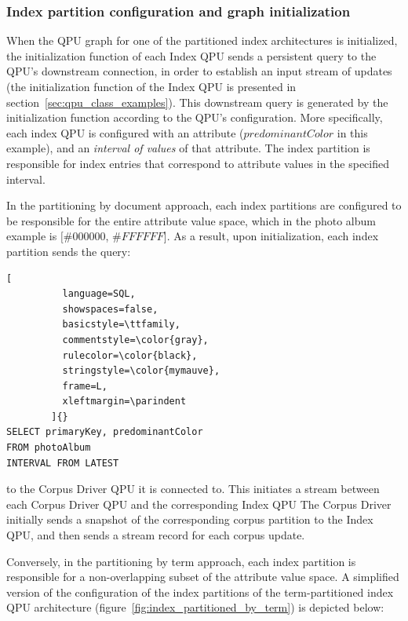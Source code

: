\subsubsection{Index partition configuration and graph initialization}

When the QPU graph for one of the partitioned index architectures is initialized,
the initialization function of each Index QPU sends a persistent query to the QPU's downstream connection,
in order to establish an input stream of updates (the initialization function of the Index QPU is presented in section~\ref{sec:qpu_class_examples}).
This downstream query is generated by the initialization function according to the QPU's configuration.
More specifically, each index QPU is configured with an attribute ($predominantColor$ in this example),
and an \textit{interval of values} of that attribute.
The index partition is responsible for index entries that correspond to attribute values in the specified interval.

\medskip
\noindent
In the partitioning by document approach,
each index partitions are configured to be responsible for the entire attribute value space,
which in the photo album example is $[\#000000$, $\#FFFFFF$].
As a result, upon initialization, each index partition sends the query: 

\begin{lstlisting}[
          language=SQL,
          showspaces=false,
          basicstyle=\ttfamily,
          commentstyle=\color{gray},
          rulecolor=\color{black},
          stringstyle=\color{mymauve},
          frame=L,
          xleftmargin=\parindent
        ]{}
SELECT primaryKey, predominantColor
FROM photoAlbum
INTERVAL FROM LATEST
\end{lstlisting}

\noindent
to the Corpus Driver QPU it is connected to.
This initiates a stream between each Corpus Driver QPU and the corresponding Index QPU
The Corpus Driver initially sends a snapshot of the corresponding corpus partition to the
Index QPU, and then sends a stream record for each corpus update.

Conversely, in the partitioning by term approach, each index partition is responsible for a non-overlapping subset of the
attribute value space.
A simplified version of the configuration of the index partitions of the term-partitioned index QPU architecture
(figure~\ref{fig:index_partitioned_by_term}) is depicted below: \\

